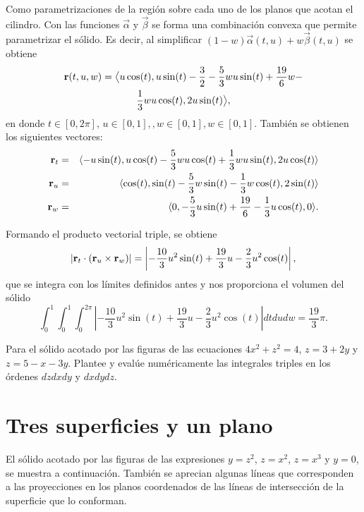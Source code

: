 Como parametrizaciones de la región sobre cada uno de los planos que acotan el cilindro. Con las funciones
$\overrightarrow{\alpha}$ y $\overrightarrow{\beta}$ se forma una combinación convexa que permite parametrizar el sólido. Es decir, al simplificar $(1-w)\overrightarrow{\alpha}(t,u)+w\overrightarrow{\beta}(t,u)$
se obtiene
\begin{multline*}
{\bf r}( t,u,w) = \big \langle u\cos (t),u\sin(t)-\frac{3}{2}-\frac{5}{3}wu\sin (t)+\frac{19}{6}w- \\ \frac{1}{3}wu\cos (t),2u\sin (t) \big \rangle,
\end{multline*}
%
en donde $t\in[0, 2\pi],\, u\in[0, 1],, w\in[0, 1], w\in[0, 1]$. También se obtienen los siguientes vectores:
{\small
\begin{eqnarray*}
{\bf r}_{t} &=& \langle -u\sin (t),u\cos (t)-\frac{5}{3}wu\cos (t)+\frac{1}{3}wu\sin (t),2u\cos (t)\rangle \\
{\bf r}_{u}&=& \langle \cos (t),\sin (t)-\frac{5}{3}w\sin (t)-\frac{1}{3}w\cos (t),2\sin (t)\rangle \\
{\bf r}_{w}&=& \langle 0,-\frac{5}{3}u\sin (t)+\frac{19}{6}-\frac{1}{3}u\cos (t),0\rangle.
\end{eqnarray*}
}

Formando el producto vectorial triple, se obtiene
\[| {\bf r}_{t}\cdot ( {\bf r}_{u}\times {\bf r}_{w}) | = \left| -\frac{10}{3}u^2\sin (t)+\frac{19}{3}u-\frac{2}{3}u^2\cos (t)\right |,\]
%
que se integra con los límites definidos antes y nos proporciona el volumen del sólido
%
\[\int_{0}^{1}\int_{0}^{1}\int_{0}^{2\pi }\left | -\frac{10}{3}u^2\sin (t)
+\frac{19}{3}u-\frac{2}{3}u^2\cos (t)\right | dtdudw= \frac{19}{3}\pi.\]

\begin{ejer}
Para el sólido acotado por las figuras de las ecuaciones $4x^2 + z^2 = 4$, $z = 3 + 2y$ y $z = 5 -x-3y$. Plantee y evalúe numéricamente las integrales triples en los órdenes $dzdxdy$ y $dxdydz$.
\end{ejer}

\section{Tres superficies y un plano}

El sólido acotado por las figuras de las expresiones $y=z^2$, $z=x^2$, $z=x^3$ y $y=0$,
se muestra a continuación. También se aprecian algunas líneas que corresponden a las proyecciones en los planos coordenados de las líneas de intersección de la superficie que lo conforman.

